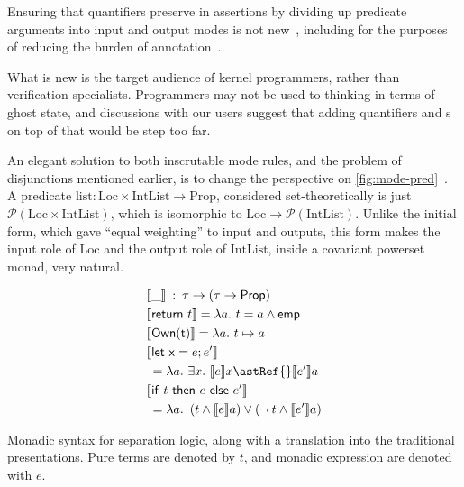 Ensuring that quantifiers preserve  in assertions by
dividing up predicate arguments into input and output modes is
not new~,
including for the purposes of reducing the burden of
annotation~.

What is new is the target audience of kernel programmers, rather than
verification specialists. Programmers may not be used to thinking in terms of
ghost state, and discussions with our users suggest that adding quantifiers and
s on top of that would be step too far.

An elegant solution to both inscrutable mode rules, and the problem of
disjunctions mentioned earlier, is to change the perspective on
\cref{fig:mode-pred}~. A predicate
$\mathrm{list} : \mathrm{Loc} \times \mathrm{IntList} \rightarrow
\mathrm{Prop}$, considered set-theoretically is just $\mathcal{P} (\mathrm{Loc}
\times \mathrm{IntList})$, which is isomorphic to $\mathrm{Loc} \rightarrow
\mathcal{P} (\mathrm{IntList})$. Unlike the initial form, which gave ``equal
weighting'' to input and outputs, this form makes the input role of
$\mathrm{Loc}$ and the output role of $\mathrm{IntList}$, inside a covariant
powerset monad, very natural.

\begin{marginfigure}
    \small%
    \begin{align*}
        &\llbracket \_ \rrbracket \::\: \tau \rightarrow (\tau \rightarrow \mathsf{Prop}) \\
        &\llbracket \mathsf{return}\ t \rrbracket = \lambda a.\ t = a \wedge{} \mathsf{emp} \\
        &\llbracket \mathsf{Own(t)} \rrbracket = \lambda a.\ t \mapsto{} a \\
        &\llbracket \mathsf{let\ x} = e; e' \rrbracket \\
        &\: = \lambda a.\ \exists x.\ \llbracket e \rrbracket x \astRef{} \llbracket e' \rrbracket a \\
        &\llbracket \mathsf{if}\ t\ \mathsf{then}\ e\ \mathsf{else}\ e' \rrbracket \\
        &\: = \lambda a.\  \left( t \wedge \llbracket e \rrbracket a \right) \vee \left( \neg \; t \wedge \llbracket e' \rrbracket a \right)
    \end{align*}
    \caption{Monadic syntax for separation logic, along with a translation into the traditional presentations. Pure
        terms are denoted by $t$, and monadic expression are denoted with $e$.}\label{fig:monad-sl}
\end{marginfigure}

